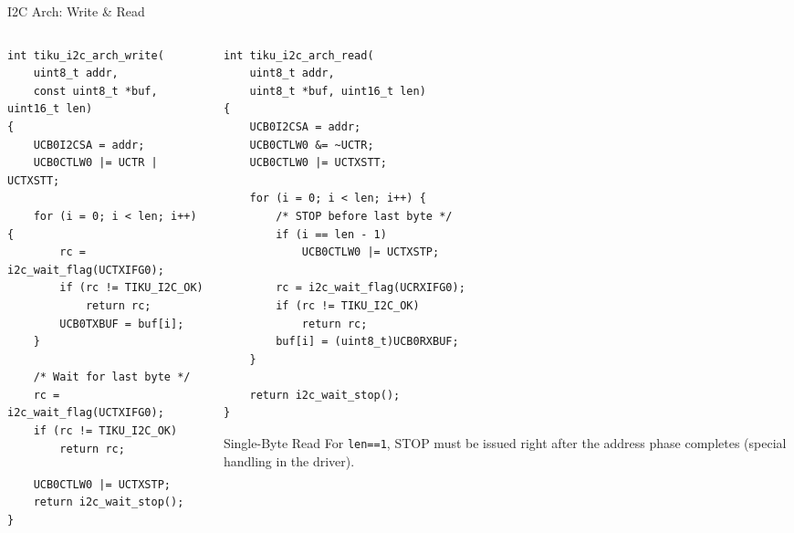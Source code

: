 \documentclass[aspectratio=169, 10pt]{beamer}
\begin{document}
\begin{frame}[fragile]{I2C Arch: Write \& Read}
\begin{columns}[T]
\begin{column}{0.48\textwidth}
\begin{lstlisting}[style=cstyle, basicstyle=\ttfamily\tiny,
  title={Write transaction}]
int tiku_i2c_arch_write(
    uint8_t addr,
    const uint8_t *buf, uint16_t len)
{
    UCB0I2CSA = addr;
    UCB0CTLW0 |= UCTR | UCTXSTT;

    for (i = 0; i < len; i++) {
        rc = i2c_wait_flag(UCTXIFG0);
        if (rc != TIKU_I2C_OK)
            return rc;
        UCB0TXBUF = buf[i];
    }

    /* Wait for last byte */
    rc = i2c_wait_flag(UCTXIFG0);
    if (rc != TIKU_I2C_OK)
        return rc;

    UCB0CTLW0 |= UCTXSTP;
    return i2c_wait_stop();
}
\end{lstlisting}
\end{column}

\begin{column}{0.48\textwidth}
\begin{lstlisting}[style=cstyle, basicstyle=\ttfamily\tiny,
  title={Read transaction (multi-byte)}]
int tiku_i2c_arch_read(
    uint8_t addr,
    uint8_t *buf, uint16_t len)
{
    UCB0I2CSA = addr;
    UCB0CTLW0 &= ~UCTR;
    UCB0CTLW0 |= UCTXSTT;

    for (i = 0; i < len; i++) {
        /* STOP before last byte */
        if (i == len - 1)
            UCB0CTLW0 |= UCTXSTP;

        rc = i2c_wait_flag(UCRXIFG0);
        if (rc != TIKU_I2C_OK)
            return rc;
        buf[i] = (uint8_t)UCB0RXBUF;
    }

    return i2c_wait_stop();
}
\end{lstlisting}

\vspace{0.3em}
\begin{alertblock}{Single-Byte Read}
For \texttt{len==1}, STOP must be issued
right after the address phase completes
(special handling in the driver).
\end{alertblock}
\end{column}
\end{columns}
\end{frame}
\end{document}
